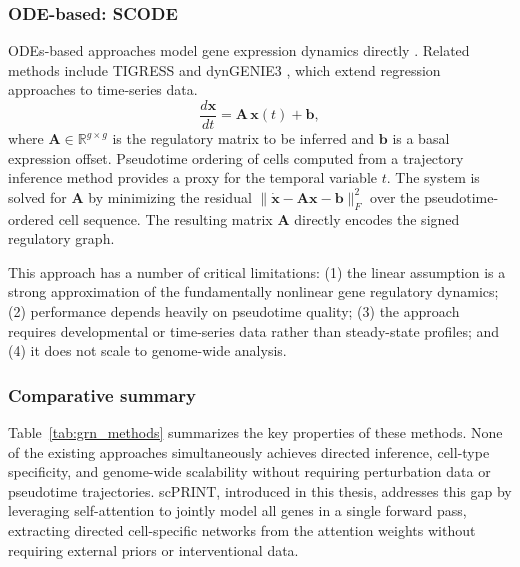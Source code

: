 \subsubsection{ODE-based: SCODE}
\glspl{ODE}-based approaches model gene expression dynamics directly \cite{matsumotoSCODEEfficientRegulatory2017}. 
Related methods include TIGRESS \cite{hauryTIGRESSTrustfulInference2012} and dynGENIE3 \cite{thuDynGENIE3DynamicalGENIE32018}, 
which extend regression approaches to time-series data.
\begin{equation}
  \frac{d\mathbf{x}}{dt} = \mathbf{A}\,\mathbf{x}(t) + \mathbf{b},
\end{equation}
where \(\mathbf{A} \in \mathbb{R}^{g \times g}\) is the regulatory matrix to be inferred and
\(\mathbf{b}\) is a basal expression offset. Pseudotime ordering of cells computed from a
trajectory inference method provides a proxy for the temporal variable \(t\). The system is solved
for \(\mathbf{A}\) by minimizing the residual \(\|\dot{\mathbf{x}} - \mathbf{A}\mathbf{x} -
\mathbf{b}\|_F^2\) over the pseudotime-ordered cell sequence. The resulting matrix \(\mathbf{A}\)
directly encodes the signed regulatory graph.

This approach has a number of critical limitations: (1) the linear assumption is a strong
approximation of the fundamentally nonlinear gene regulatory dynamics; (2) performance depends
heavily on pseudotime quality; (3) the approach requires developmental or time-series data rather
than steady-state profiles; and (4) it does not scale to genome-wide analysis.

\subsubsection{Comparative summary}
Table~\ref{tab:grn_methods} summarizes the key properties of these methods. None of the existing
approaches simultaneously achieves directed inference, cell-type specificity, and genome-wide
scalability without requiring perturbation data or pseudotime trajectories. scPRINT, introduced
in this thesis, addresses this gap by leveraging self-attention to jointly model all genes in a
single forward pass, extracting directed cell-specific networks from the attention weights without
requiring external priors or interventional data.

